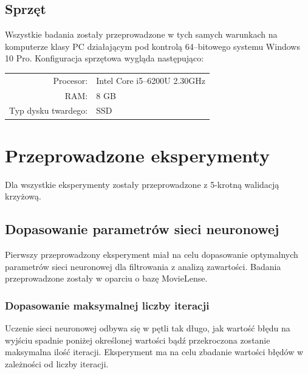 \documentclass[twoside]{iisthesis}
\begin{document}
		\subsection{Sprzęt}
		
		Wszystkie badania zostały przeprowadzone w tych samych warunkach na komputerze klasy PC działającym pod kontrolą 64--bitowego systemu Windows 10 Pro. Konfiguracja sprzętowa wygląda następująco:
		
		\begin{center}
			\begin{tabular}{ r  l  }
				Procesor: & Intel Core i5--6200U 2.30GHz \\ 
				RAM: & 8 GB \\  
				Typ dysku twardego: & SSD     
			\end{tabular}
		\end{center}
	
	\section{Przeprowadzone eksperymenty}
		
		Dla wszystkie eksperymenty zostały przeprowadzone z 5-krotną walidacją krzyżową.
		
		\subsection{Dopasowanie parametrów sieci neuronowej}
	
		Pierwszy przeprowadzony eksperyment miał na celu dopasowanie optymalnych parametrów sieci neuronowej dla filtrowania z analizą zawartości. Badania przeprowadzone zostały w oparciu o bazę MovieLense. 
		
		\subsubsection{Dopasowanie maksymalnej liczby iteracji}
		\label{exp:expiterations}
		
			Uczenie sieci neuronowej odbywa się w pętli tak długo, jak wartość błędu na wyjściu spadnie poniżej określonej wartości bądź przekroczona zostanie maksymalna ilość iteracji. Eksperyment ma na celu zbadanie wartości błędów w zależności od liczby iteracji.
				
\end{document}

